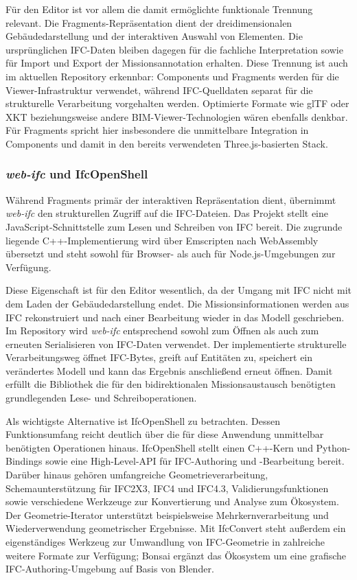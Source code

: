 Für den Editor ist vor allem die damit ermöglichte funktionale Trennung relevant. Die
Fragments-Repräsentation dient der dreidimensionalen Gebäudedarstellung und der interaktiven Auswahl
von Elementen. Die ursprünglichen IFC-Daten bleiben dagegen für die fachliche Interpretation sowie
für Import und Export der Missionsannotation erhalten. Diese Trennung ist auch im aktuellen
Repository erkennbar: Components und Fragments werden für die Viewer-Infrastruktur verwendet,
während IFC-Quelldaten separat für die strukturelle Verarbeitung vorgehalten werden.  Optimierte
Formate wie glTF oder XKT beziehungsweise andere BIM-Viewer-Technologien wären ebenfalls denkbar.
Für Fragments spricht hier insbesondere die unmittelbare Integration in Components und damit in den
bereits verwendeten Three.js-basierten Stack.

\subsubsection{\textit{web-ifc} und IfcOpenShell}
Während Fragments primär der interaktiven Repräsentation dient, übernimmt \textit{web-ifc} den
strukturellen Zugriff auf die IFC-Dateien. Das Projekt stellt eine JavaScript-Schnittstelle zum
Lesen und Schreiben von IFC bereit. Die zugrunde liegende C++-Implementierung wird über Emscripten
nach WebAssembly übersetzt und steht sowohl für Browser- als auch für Node.js-Umgebungen zur
Verfügung.

Diese Eigenschaft ist für den Editor wesentlich, da der Umgang mit IFC nicht mit dem Laden der
Gebäudedarstellung endet. Die Missionsinformationen werden aus IFC rekonstruiert und nach einer
Bearbeitung wieder in das Modell geschrieben. Im Repository wird \textit{web-ifc} entsprechend
sowohl zum Öffnen als auch zum erneuten Serialisieren von IFC-Daten verwendet. Der implementierte
strukturelle Verarbeitungsweg öffnet IFC-Bytes, greift auf Entitäten zu, speichert ein verändertes
Modell und kann das Ergebnis anschließend erneut öffnen.  Damit erfüllt die Bibliothek die für den
bidirektionalen Missionsaustausch benötigten grundlegenden Lese- und Schreiboperationen.

Als wichtigste Alternative ist IfcOpenShell zu betrachten. Dessen Funktionsumfang reicht deutlich
über die für diese Anwendung unmittelbar benötigten Operationen hinaus. IfcOpenShell stellt einen
C++-Kern und Python-Bindings sowie eine High-Level-API für IFC-Authoring und -Bearbeitung bereit.
Darüber hinaus gehören umfangreiche Geometrieverarbeitung, Schemaunterstützung für IFC2X3, IFC4 und
IFC4.3, Validierungsfunktionen sowie verschiedene Werkzeuge zur Konvertierung und Analyse zum
Ökosystem. Der Geometrie-Iterator unterstützt beispielsweise Mehrkernverarbeitung und
Wiederverwendung geometrischer Ergebnisse. Mit IfcConvert steht außerdem ein eigenständiges Werkzeug
zur Umwandlung von IFC-Geometrie in zahlreiche weitere Formate zur Verfügung; Bonsai ergänzt das
Ökosystem um eine grafische IFC-Authoring-Umgebung auf Basis von Blender.


